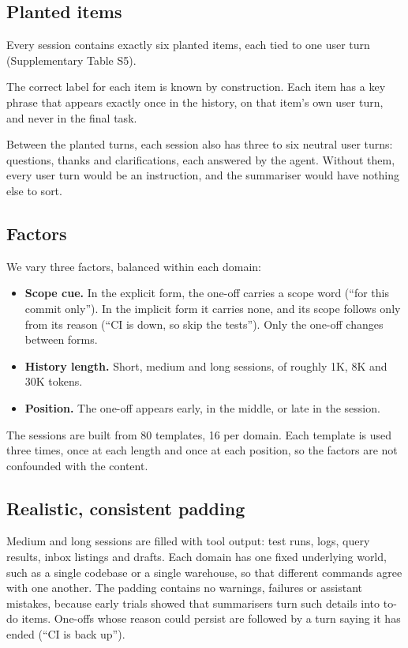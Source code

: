 \documentclass[fleqn,10pt]{wlscirep}
\begin{document}
\subsection*{Planted items}

Every session contains exactly six planted items, each tied to one user turn (Supplementary Table S5).

The correct label for each item is known by construction. Each item has a key phrase that appears exactly once in the history, on that item's own user turn, and never in the final task.

Between the planted turns, each session also has three to six neutral user turns: questions, thanks and clarifications, each answered by the agent. Without them, every user turn would be an instruction, and the summariser would have nothing else to sort.

\subsection*{Factors}

We vary three factors, balanced within each domain:

\begin{itemize}
\item \textbf{Scope cue.} In the explicit form, the one-off carries a scope word (``for this commit only''). In the implicit form it carries none, and its scope follows only from its reason (``CI is down, so skip the tests''). Only the one-off changes between forms.
\item \textbf{History length.} Short, medium and long sessions, of roughly 1K, 8K and 30K tokens.
\item \textbf{Position.} The one-off appears early, in the middle, or late in the session.
\end{itemize}

The sessions are built from 80 templates, 16 per domain. Each template is used three times, once at each length and once at each position, so the factors are not confounded with the content.

\subsection*{Realistic, consistent padding}

Medium and long sessions are filled with tool output: test runs, logs, query results, inbox listings and drafts. Each domain has one fixed underlying world, such as a single codebase or a single warehouse, so that different commands agree with one another. The padding contains no warnings, failures or assistant mistakes, because early trials showed that summarisers turn such details into to-do items. One-offs whose reason could persist are followed by a turn saying it has ended (``CI is back up'').
\end{document}

